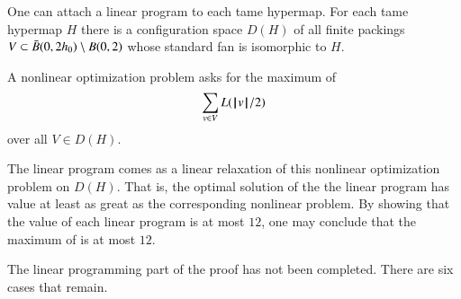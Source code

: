 One can attach a linear program to each tame hypermap.
For each tame hypermap $H$ there is a configuration space $D(H)$ of all
finite packings $V\subset \bar B(0,2{h_0})\setminus B(0,2)$ whose standard fan is
isomorphic to $H$.
%
%

A nonlinear optimization problem asks for the maximum of
\begin{equation}\label{eqn:L2}
\sum_{v\in V} L({{\hskip0.1em|\hskip-0.15em|\hskip0.1em}v{\hskip0.1em|\hskip-0.15em|\hskip0.1em}}/2)
\end{equation}
over all $V\in D(H)$.

The linear program comes as a linear relaxation of this nonlinear
optimization problem on $D(H)$. That is, the optimal solution of the
the linear program has value at least as great as the corresponding
nonlinear problem.  By showing that the value of each linear program
is at most $12$, one may conclude that the maximum of 
is at most $12$.


\begin{note}%
The linear programming part of the proof has not been completed. There are six cases that remain.
\end{note}

